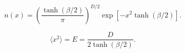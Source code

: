 \documentclass{article}
\begin{document}
\[
  n(x) = \left(\frac{\tanh(\beta/2)}{\pi}\right)^{D/2}
         \exp\left[-x^2\tanh(\beta/2)\right].
  \]
\pagebreak

\[
  \langle x^2\rangle = E = \frac{D}{2\tanh(\beta/2)}.
  \]
\pagebreak
\end{document}

